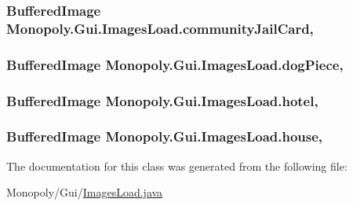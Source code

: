 \subsubsection[{\texorpdfstring{community\+Jail\+Card}{communityJailCard}}]{\setlength{\rightskip}{0pt plus 5cm}Buffered\+Image Monopoly.\+Gui.\+Images\+Load.\+community\+Jail\+Card\hspace{0.3cm}{\ttfamily [static]}, {\ttfamily [protected]}}\hypertarget{class_monopoly_1_1_gui_1_1_images_load_addf89cd2902287adb11639523bb9f57c}{}\label{class_monopoly_1_1_gui_1_1_images_load_addf89cd2902287adb11639523bb9f57c}
\subsubsection[{\texorpdfstring{dog\+Piece}{dogPiece}}]{\setlength{\rightskip}{0pt plus 5cm}Buffered\+Image Monopoly.\+Gui.\+Images\+Load.\+dog\+Piece\hspace{0.3cm}{\ttfamily [static]}, {\ttfamily [protected]}}\hypertarget{class_monopoly_1_1_gui_1_1_images_load_aa7d816773b5894b3ff530ac1f86f164e}{}\label{class_monopoly_1_1_gui_1_1_images_load_aa7d816773b5894b3ff530ac1f86f164e}
\subsubsection[{\texorpdfstring{hotel}{hotel}}]{\setlength{\rightskip}{0pt plus 5cm}Buffered\+Image Monopoly.\+Gui.\+Images\+Load.\+hotel\hspace{0.3cm}{\ttfamily [static]}, {\ttfamily [protected]}}\hypertarget{class_monopoly_1_1_gui_1_1_images_load_a6af54624772426e590e5e85d2ec98437}{}\label{class_monopoly_1_1_gui_1_1_images_load_a6af54624772426e590e5e85d2ec98437}
\subsubsection[{\texorpdfstring{house}{house}}]{\setlength{\rightskip}{0pt plus 5cm}Buffered\+Image Monopoly.\+Gui.\+Images\+Load.\+house\hspace{0.3cm}{\ttfamily [static]}, {\ttfamily [protected]}}\hypertarget{class_monopoly_1_1_gui_1_1_images_load_a085be516ecb31d5b75d8a0219dc223d0}{}\label{class_monopoly_1_1_gui_1_1_images_load_a085be516ecb31d5b75d8a0219dc223d0}


The documentation for this class was generated from the following file\+:\begin{DoxyCompactItemize}
\item 
Monopoly/\+Gui/\hyperlink{_images_load_8java}{Images\+Load.\+java}\end{DoxyCompactItemize}
